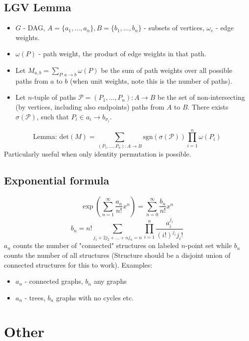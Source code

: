     \subsection{LGV Lemma}
        \begin{itemize}
            \item $G$ - DAG, $A = \{a_1, \dots, a_n\}, B = \{b_1, \dots, b_n\}$ - subsets of vertices, $\omega_e$ - edge weights.
            \item $\omega(P)$ - path weight, the product of edge weights in that path.
            \item Let $M_{a,b} = \sum_{P: a \to b} \omega(P)$ be the sum of path weights over all possible paths from $a$ to $b$ (when unit weights, note this is the number of paths).
            \item Let $n$-tuple of paths $\mathcal P = (P_1, \dots, P_n): A \to B$ be the set of non-intersecting (by vertices, including also endpoints) paths from $A$ to $B$.
            There exists $\sigma(\mathcal P)$, such that $P_i \in a_i \to b_{\sigma_i}$.
        \end{itemize}
        \small \[\text{Lemma: }\text{det}(M) = \sum_{(P_1, \dots, P_n):A \to B} \text{sgn}(\sigma(\mathcal P)) \prod_{i=1}^n \omega(P_i)\]
        Particularly useful when only identity permutation is possible.

	\subsection{Exponential formula}
		\[ \exp\left(\sum_{n=1}^{\infty}\frac{a_n}{n!}x^n\right) = \sum_{n=0}^{\infty}\frac{b_n}{n!}x^n\]
		\[b_n = n! \sum_{j_1 + 2j_2 + \dots + nj_n = n}\prod_{i=1}^{n}\frac{a_i^{j_i}}{(i!)^{j_i} j_i!}\]
		$a_n$ counts the number of "connected" structures on labeled $n$-point set while $b_n$ counts the number
		of all structures (Structure should be a disjoint union of connected structures for this to work). Examples:
		\begin{itemize}[noitemsep]
			\item $a_n$ - connected graphs, $b_n$ any graphs
			\item $a_n$ - trees, $b_n$ graphs with no cycles etc.
		\end{itemize}

\section{Other}
